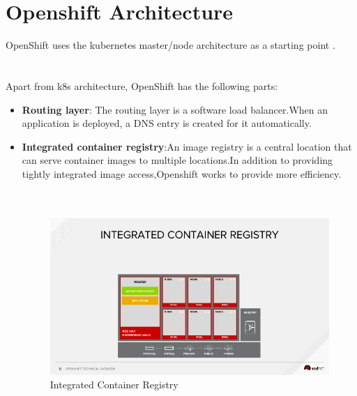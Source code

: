 \documentclass[11pt]{report}
\begin{document}
	\section{Openshift Architecture}
	OpenShift uses the kubernetes master/node architecture as a starting point .\ \\
	\ \\
	\ \\
	Apart from k8s architecture, OpenShift has the following parts:
	\ \\
	\begin{itemize}
		\item\textbf{ Routing layer}:
		The routing layer is a software load balancer.When an application is deployed, a DNS entry is created for it automatically.
		\vspace{1cm}
		
		\item\textbf{Integrated container registry}:An image registry is a central location that can serve container images to multiple locations.In addition to providing tightly integrated image access,Openshift works to provide more efficiency.
		\ \\
		\ \\
		\ \\
		\begin{figure}[h!]
    	\begin{center}
    	    \includegraphics[scale=0.75]{openshiftimageregistry.jpg} 
    		\caption{Integrated Container Registry\cite{Intreg}}
    	  \end{center}
	  
		\end{figure}
		
		\ \\
		\ \\
	\end{itemize}
\end{document}
